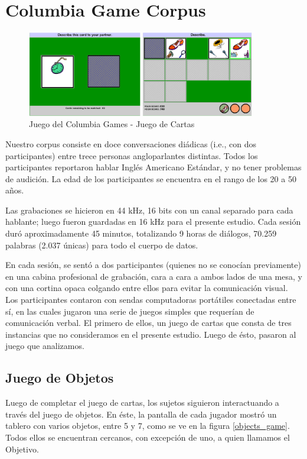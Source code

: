 \section{Columbia Game Corpus}

\begin{figure}[t]
\centering
\includegraphics[width=10cm]{images/columbia_games_card_game.png}
\caption{Juego del Columbia Games - Juego de Cartas}
\end{figure}


\newcommand{\cardgame} {\emph{Juego de cartas}}
\newcommand{\objectgame} {\emph{Juego de objetos}}


Nuestro corpus \cite{GRAV2009} consiste en doce conversaciones diádicas (i.e., con dos participantes) entre trece personas angloparlantes distintas. Todos los participantes reportaron hablar Inglés Americano Estándar, y no tener problemas de audición. La edad de los participantes se encuentra en el rango de los 20 a 50 años.

Las grabaciones se hicieron en 44 kHz, 16 bits con un canal separado para cada hablante; luego fueron guardadas en 16 kHz para el presente estudio. Cada sesión duró aproximadamente 45 minutos, totalizando 9 horas de
diálogos, 70.259 palabras (2.037 únicas) para todo el cuerpo de datos.

En cada sesión, se sentó a dos participantes (quienes no se conocían previamente) en una cabina profesional de grabación, cara a cara a ambos lados de una mesa, y con una cortina opaca colgando entre ellos para evitar la comunicación visual. Los participantes contaron con sendas computadoras portátiles conectadas entre sí, en las cuales jugaron una serie de juegos simples que requerían de comunicación verbal. El primero de ellos, un juego de cartas que consta de tres instancias que no consideramos en el presente estudio. Luego de ésto, pasaron al juego que analizamos.

\subsection{Juego de Objetos}

Luego de completar el juego de cartas, los sujetos siguieron interactuando a través del juego de objetos. En éste, la pantalla de cada jugador mostró un tablero con varios objetos, entre 5 y 7, como se ve en la figura \ref{objects_game}. Todos ellos se encuentran cercanos, con excepción de uno, a quien llamamos el Objetivo.

